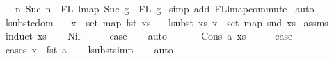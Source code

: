 \begin{isabellebody}
\ \ \ {\isachardoublequoteopen}{\isacharbraceleft}{\kern0pt}n{\isachardot}{\kern0pt}\ Suc\ n\ {\isasymin}\ FL\ {\isacharparenleft}{\kern0pt}lmap\ Suc\ g{\isacharparenright}{\kern0pt}{\isacharbraceright}{\kern0pt}\ {\isacharequal}{\kern0pt}\ FL\ g{\isachardoublequoteclose}\isanewline
%
\isadelimproof
%
\endisadelimproof
%
\isatagproof
{}\isamarkupfalse%
\ {\isacharparenleft}{\kern0pt}simp\ add{\isacharcolon}{\kern0pt}\ FL{\isacharunderscore}{\kern0pt}lmap{\isacharunderscore}{\kern0pt}commute{\isacharparenright}{\kern0pt}\isanewline
{}\isamarkupfalse%
\ auto%
\endisatagproof
{\isafoldproof}%
%
\isadelimproof
%
\endisadelimproof
%
\isadelimdocument
%
\endisadelimdocument
%
\isatagdocument
%
\isamarkuptrue%
%
\endisatagdocument
{\isafolddocument}%
%
\isadelimdocument
%
\endisadelimdocument
{}\isamarkupfalse%
\ lsubst{\isacharunderscore}{\kern0pt}cdom{\isacharcolon}{\kern0pt}\isanewline
\ \ \ {\isachardoublequoteopen}x\ {\isasymin}\ set\ {\isacharparenleft}{\kern0pt}map\ fst\ xs{\isacharparenright}{\kern0pt}{\isachardoublequoteclose}\isanewline
\ \ \ {\isachardoublequoteopen}lsubst\ xs\ x\ {\isasymin}\ set\ {\isacharparenleft}{\kern0pt}map\ snd\ xs{\isacharparenright}{\kern0pt}{\isachardoublequoteclose}\isanewline
%
\isadelimproof
%
\endisadelimproof
%
\isatagproof
{}\isamarkupfalse%
\ assms\isanewline
{}\isamarkupfalse%
\ {\isacharparenleft}{\kern0pt}induct\ xs{\isacharparenright}{\kern0pt}\isanewline
\ \ \isamarkupfalse%
\ Nil\isanewline
\ \ \isamarkupfalse%
\ \isamarkupfalse%
\ {\isacharquery}{\kern0pt}case\isanewline
\ \ \isamarkupfalse%
\ auto\isanewline
\ \ \isamarkupfalse%
\isanewline
{}\isamarkupfalse%
\isanewline
\ \ \isamarkupfalse%
\ {\isacharparenleft}{\kern0pt}Cons\ a\ xs{\isacharparenright}{\kern0pt}\isanewline
\ \ \isamarkupfalse%
\ \isamarkupfalse%
\ {\isacharquery}{\kern0pt}case\isanewline
\ \ \isamarkupfalse%
\ {\isacharparenleft}{\kern0pt}cases\ {\isachardoublequoteopen}x\ {\isacharequal}{\kern0pt}\ fst\ a{\isachardoublequoteclose}{\isacharparenright}{\kern0pt}\isanewline
\ \ \isamarkupfalse%
\ lsubst{\isacharunderscore}{\kern0pt}simp\isanewline
\ \ \isamarkupfalse%
\ auto\isanewline

\end{isabellebody}
